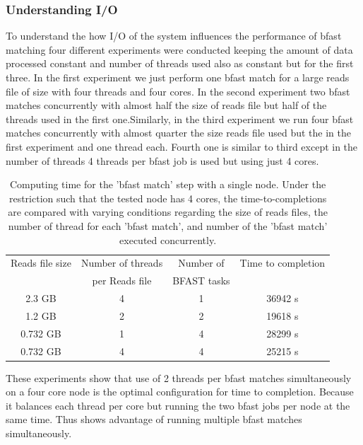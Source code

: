 \documentclass[12pt]{article}
\begin{document}
\subsubsection{Understanding I/O}
{
To understand the how I/O of the system influences the performance of bfast matching four different experiments were conducted keeping the amount of data processed constant and number of threads used also as constant but for the first three. In the first experiment we just perform one bfast match for a large reads file of size with four threads and four cores. In the second experiment two bfast matches concurrently with almost half the size of reads file but half of the threads used in the first one.Similarly, in the third experiment we run four bfast matches concurrently with almost quarter the size reads file used but the in the first experiment and one thread each. Fourth one is similar to third except in the number of threads 4 threads per bfast job is used but using just 4 cores.

 \begin{table}
 \begin{tabular}{|c|c|c|c|} 
 \hline 
Reads file size &  Number of threads  & Number of  & Time to completion \\
& per Reads file&  BFAST tasks & \\  \hline
2.3 GB &  4 & 1 & 36942 s \\
1.2 GB & 2 & 2 & 19618 s \\
0.732 GB & 1 & 4 & 28299 s\\ 
0.732  GB & 4 & 4 & 25215 s\\

 \hline
 \end{tabular}
 \label{table:understand I/o} 
 \caption{Computing time for the 'bfast match' step with a single node.  Under the restriction such that the tested node has 4 cores, the time-to-completions are compared with varying conditions regarding the size of reads files, the number of thread for each 'bfast match', and number of the 'bfast match' executed concurrently.}
\end{table}

These experiments show that use of 2 threads per bfast matches simultaneously on a four core node is the optimal configuration for time to completion. Because it balances each thread per core but  running the two bfast jobs per node at the same time. Thus shows advantage of running multiple bfast matches simultaneously. 


}
\end{document}
